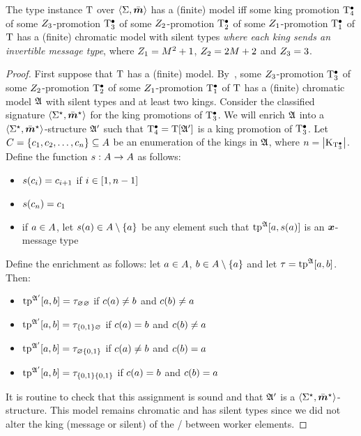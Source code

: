 \begin{remark}\label{rem:prop-kingsinv}
The type instance $\mathrm{T}$ over $\left\langle \mathrm{\Sigma},\bar{\bm{m}} \right\rangle$ has a (finite) model
iff some king promotion $\mathrm{T}_{4}^{\bullet}$
of some $Z_{3}$-promotion $\mathrm{T}_{3}^{\bullet}$
of some $Z_{2}$-promotion $\mathrm{T}_{2}^{\bullet}$
of some $Z_{1}$-promotion $\mathrm{T}_{1}^{\bullet}$ 
of $\mathrm{T}$ has a (finite) chromatic model with silent types
\emph{where each king sends an invertible message type},
where $Z_{1} = M^2+1$, $Z_{2} = 2M+2$ and $Z_{3} = 3$.
\end{remark}
\begin{proof}
First suppose that $\mathrm{T}$ has a (finite) model.
By~,
some $Z_{3}$-promotion $\mathrm{T}_{3}^{\bullet}$
of some $Z_{2}$-promotion $\mathrm{T}_{2}^{\bullet}$
of some $Z_{1}$-promotion $\mathrm{T}_{1}^{\bullet}$
of $\mathrm{T}$ has a (finite) chromatic model $\mathfrak{A}$ with silent types and at least
two kings.
Consider the classified signature $\left\langle \mathrm{\Sigma}^{\star},\bar{\bm{m}}^{\star} \right\rangle$ for the king promotions of
$\mathrm{T}_{3}^{\bullet}$.
We will enrich $\mathfrak{A}$ into a $\left\langle \mathrm{\Sigma}^{\star},\bar{\bm{m}}^{\star} \right\rangle$-structure $\mathfrak{A'}$ such that
$\mathrm{T}_{4}^{\bullet} = \mathrm{T}[\mathfrak{A'}]$ is a king promotion of $\mathrm{T}_{3}^{\bullet}$.
Let $C = \left\{c_{1},c_{2},\dots,c_{n}\right\}\subseteq A$ be an enumeration
of the kings in $\mathfrak{A}$, where $n=\left|{\mathrm{K}}_{\mathrm{T}_{3}^{\bullet}}\right|$.
Define the function $s : A\to A$ as follows:
\begin{itemize}
  \item $s(c_{i}) = c_{i+1}$ if $i\in[1,n-1]$
  \item $s(c_{n}) = c_{1}$
  \item if $a\in A$, let $s(a)\in A\setminus\left\{a\right\}$
  be any element such that $\operatorname{tp}^{\mathfrak{A}}[a,s(a)]$ is an $\bm{x}$-message type
\end{itemize}
Define the enrichment as follows:
let $a\in A$, $b\in A\setminus\left\{a\right\}$ and let $\tau=\operatorname{tp}^{\mathfrak{A}}[a,b]$.
Then:
\begin{itemize}
  \item $\operatorname{tp}^{\mathfrak{A'}}[a,b] = {\tau}_{\varnothing\varnothing}$
  if $c(a)\neq b$ and $c(b)\neq a$
  \item $\operatorname{tp}^{\mathfrak{A'}}[a,b] = {\tau}_{\left\{0,1\right\}\varnothing}$
  if $c(a)=b$ and $c(b)\neq a$
  \item $\operatorname{tp}^{\mathfrak{A'}}[a,b] = {\tau}_{\varnothing\left\{0,1\right\}}$
  if $c(a)\neq b$ and $c(b)=a$
  \item $\operatorname{tp}^{\mathfrak{A'}}[a,b] = {\tau}_{\left\{0,1\right\}\left\{0,1\right\}}$
  if $c(a)=b$ and $c(b)=a$
\end{itemize}
It is routine to check that this assignment is sound and that $\mathfrak{A'}$ is a
$\left\langle \mathrm{\Sigma}^{\star},\bar{\bm{m}}^{\star} \right\rangle$-structure.
This model remains chromatic and has silent types since we did not alter the
king (message or silent) of the \twotypes/ between worker elements.
\end{proof}

